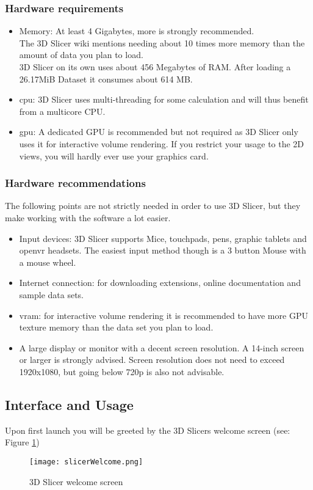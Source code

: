 \subsubsection{Hardware requirements}
\begin{itemize}
	\item Memory: At least 4 Gigabytes, more is strongly recommended.\\The 3D Slicer wiki mentions needing about 10 times more memory than the amount of data you plan to load.\\ 3D Slicer on its own uses about 456 Megabytes of RAM. After loading a 26.17MiB Dataset it consumes about 614 MB.
	\item \gls{cpu}: 3D Slicer uses multi-threading for some calculation and will thus benefit from a multicore CPU.
	\item \gls{gpu}: A dedicated GPU is recommended but not required as 3D Slicer only uses it for interactive volume rendering. If you restrict your usage to the 2D views, you will hardly ever use your graphics card.
\end{itemize}

\subsubsection{Hardware recommendations}
The following points are not strictly needed in order to use 3D Slicer, but they make working with the software a lot easier.
\begin{itemize}
	\item Input devices: 3D Slicer supports Mice, touchpads, pens, graphic tablets and \gls{openvr} headsets. The easiest input method though is a 3 button Mouse with a mouse wheel.
	\item Internet connection: for downloading extensions, online documentation and sample data sets.
	\item \gls{vram}: for interactive volume rendering it is recommended to have more GPU texture memory than the data set you plan to load.
	\item A large display or monitor with a decent screen resolution. A 14-inch screen or larger is strongly advised. Screen resolution does not need to exceed 1920x1080, but going below 720p is also not advisable.
\end{itemize}


\subsection{Interface and Usage}
Upon first launch you will be greeted by the 3D Slicers welcome screen (see: Figure \ref{fig:slicerWelcome})
\begin{figure}[h!] %
	\centerline{
		\texttt{[image: slicerWelcome.png]}}
	\caption{3D Slicer welcome screen}\label{fig:slicerWelcome}
\end{figure}


